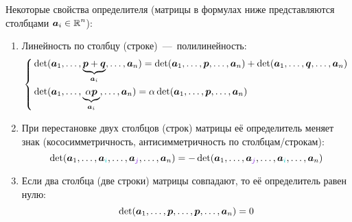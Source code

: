 \documentclass[a4paper,12pt]{article}
\theoremstyle{remark}
\begin{document}
  \begin{theorem}
    Некоторые свойства определителя (матрицы в формулах ниже представляются столбцами $\bds a_i \hm\in \RR^n$):
    \begin{enumerate}
      \item Линейность по столбцу (строке)~---~полилинейность:
        \begin{equation}\label{eq:poly-linearity}
          \left\{
            \begin{aligned}
              &\det (\boldsymbol a_1, \ldots, \underbrace{\boldsymbol p + \boldsymbol q}_{\boldsymbol a_i}, \ldots, \boldsymbol a_n)
                = \det (\boldsymbol a_1, \ldots, \boldsymbol p, \ldots, \boldsymbol a_n)
                + \det (\boldsymbol a_1, \ldots, \boldsymbol q, \ldots, \boldsymbol a_n)\\
              &\det (\boldsymbol a_1, \ldots, \underbrace{\alpha \boldsymbol p}_{\boldsymbol a_i}, \ldots, \boldsymbol a_n)
                = \alpha \det (\boldsymbol a_1, \ldots, \boldsymbol p, \ldots, \boldsymbol a_n)
            \end{aligned}
          \right.
        \end{equation}
      \item При перестановке двух столбцов (строк) матрицы её определитель меняет знак (кососимметричность, антисимметричность по столбцам/строкам):
        \begin{equation}\label{eq:row-swap}
          \det (\bds a_1, \ldots, \bds a_{\textcolor{light-cyan}{i}}, \ldots, \bds a_{\textcolor{light-purple}{j}}, \ldots, \bds a_n)
          = -\det (\bds a_1, \ldots, \bds a_{\textcolor{light-purple}{j}}, \ldots, \bds a_{\textcolor{light-cyan}{i}}, \ldots, \bds a_n)
        \end{equation}
      \item Если два столбца (две строки) матрицы совпадают, то её определитель равен нулю:
        \begin{equation}\label{eq:same-rows}
          \det (\boldsymbol a_1, \ldots, \boldsymbol p, \ldots, \boldsymbol p, \ldots, \boldsymbol a_n) = 0
        \end{equation}
    \end{enumerate}
  \end{theorem}
  
\end{document}
